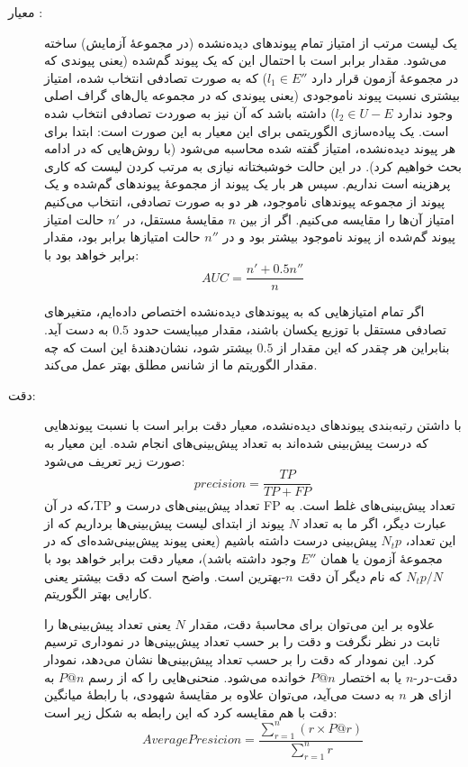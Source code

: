 \begin{description}
  \item[معیار :]
  یک لیست مرتب از امتیاز تمام پیوندهای دیده‌نشده (در مجموعهٔ آزمایش) ساخته می‌شود. مقدار  برابر است با احتمال این که یک پیوند گم‌شده (یعنی پیوندی که در مجموعهٔ آزمون قرار دارد $l_1 \in E''$) که به صورت تصادفی انتخاب شده، امتیاز بیشتری نسبت پیوند ناموجودی (یعنی پیوندی که در مجموعه یال‌های گراف اصلی وجود ندارد $l_2 \in U - E$) داشته باشد که آن نیز به صوردت تصادفی انتخاب شده است. یک پیاده‌سازی الگوریتمی برای این معیار به این صورت است: ابتدا برای هر پیوند دیده‌نشده، امتیاز گفته شده محاسبه می‌شود (با روش‌هایی که در ادامه بحث خواهیم کرد). در این حالت خوشبختانه نیازی به مرتب کردن لیست که کاری پرهزینه است نداریم. سپس هر بار یک پیوند از مجموعهٔ پیوندهای گم‌شده و یک پیوند از مجموعه پیوندهای ناموجود، هر دو به صورت تصادفی، انتخاب می‌کنیم امتیاز آن‌ها را مقایسه می‌کنیم. اگر از بین $n$ مقایسهٔ مستقل، در $n'$ حالت امتیاز پیوند گم‌شده از پیوند ناموجود بیشتر بود و در $n''$ حالت امتیازها برابر بود، مقدار  برابر خواهد بود با:
\begin{equation}
  AUC = \frac{n' + 0.5n''}{n}
\end{equation}

اگر تمام امتیازهایی که به پیوندهای دیده‌نشده اختصاص داده‌ایم، متغیرهای تصادفی مستقل با توزیع یکسان باشند، مقدار  میبایست حدود $0.5$ به دست آید. بنابراین هر چقدر که این مقدار از $0.5$ بیشتر شود، نشان‌دهندهٔ این است که چه مقدار الگوریتم ما از شانس مطلق بهتر عمل می‌کند.
  \item[دقت:]
  با داشتن رتبه‌بندی پیوندهای دیده‌نشده، معیار دقت برابر است با نسبت پیوندهایی که درست پیش‌بینی شده‌اند به تعداد پیش‌بینی‌های انجام شده. این معیار به صورت زیر تعریف می‌شود:
\begin{equation}
  precision = \frac{TP}{TP+FP}
\end{equation}
که در آن،TP تعداد پیش‌بینی‌های درست و FP تعداد پیش‌بینی‌های غلط است. به عبارت دیگر، اگر ما به تعداد $N$ پیوند از ابتدای لیست پیش‌بینی‌ها برداریم که از این تعداد، $N_tp$ پیش‌بینی درست داشته باشیم (یعنی پیوند پیش‌بینی‌شده‌ای که در مجموعهٔ آزمون یا همان $E''$ وجود داشته باشد)، معیار دقت برابر خواهد بود با $N_tp / N$ که نام دیگر آن دقت $n$-بهترین است. واضح است که دقت بیشتر یعنی کارایی بهتر الگوریتم.

علاوه بر این می‌توان برای محاسبهٔ دقت، مقدار $N$ یعنی تعداد پیش‌بینی‌ها را ثابت در نظر نگرفت و دقت را بر حسب تعداد پیش‌بینی‌ها در نموداری ترسیم کرد. این نمودار که دقت را بر حسب تعداد پیش‌بینی‌ها نشان می‌دهد، نمودار دقت-در-$n$ یا به اختصار $P@n$ خوانده می‌شود. منحنی‌هایی را که از رسم $P@n$ به ازای هر $n$ به دست می‌آید، می‌توان علاوه بر مقایسهٔ شهودی، با رابطهٔ میانگین دقت با هم مقایسه کرد که این رابطه به شکل زیر است:
\begin{equation}\label{eq:avgprecision}
  Average Presicion = \frac{\sum_{r = 1}^{n}{(r \times P@r)}}{\sum_{r = 1}^{n}{r}}
\end{equation} 
\end{description}

